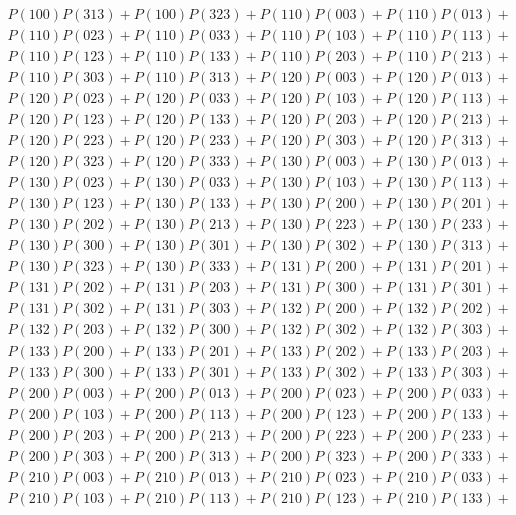 \documentclass{article}
\begin{document}
\begin{gather*}
        P(100)P(313) + P(100)P(323) + P(110)P(003) + P(110)P(013) + \\
        P(110)P(023) + P(110)P(033) + P(110)P(103) + P(110)P(113) + \\
        P(110)P(123) + P(110)P(133) + P(110)P(203) + P(110)P(213) + \\
        P(110)P(303) + P(110)P(313) + P(120)P(003) + P(120)P(013) + \\
        P(120)P(023) + P(120)P(033) + P(120)P(103) + P(120)P(113) + \\
        P(120)P(123) + P(120)P(133) + P(120)P(203) + P(120)P(213) + \\
        P(120)P(223) + P(120)P(233) + P(120)P(303) + P(120)P(313) + \\
        P(120)P(323) + P(120)P(333) + P(130)P(003) + P(130)P(013) + \\
        P(130)P(023) + P(130)P(033) + P(130)P(103) + P(130)P(113) + \\
        P(130)P(123) + P(130)P(133) + P(130)P(200) + P(130)P(201) + \\
        P(130)P(202) + P(130)P(213) + P(130)P(223) + P(130)P(233) + \\
        P(130)P(300) + P(130)P(301) + P(130)P(302) + P(130)P(313) + \\
        P(130)P(323) + P(130)P(333) + P(131)P(200) + P(131)P(201) + \\
        P(131)P(202) + P(131)P(203) + P(131)P(300) + P(131)P(301) + \\
        P(131)P(302) + P(131)P(303) + P(132)P(200) + P(132)P(202) + \\
        P(132)P(203) + P(132)P(300) + P(132)P(302) + P(132)P(303) + \\
        P(133)P(200) + P(133)P(201) + P(133)P(202) + P(133)P(203) + \\
        P(133)P(300) + P(133)P(301) + P(133)P(302) + P(133)P(303) + \\
        P(200)P(003) + P(200)P(013) + P(200)P(023) + P(200)P(033) + \\
        P(200)P(103) + P(200)P(113) + P(200)P(123) + P(200)P(133) + \\
        P(200)P(203) + P(200)P(213) + P(200)P(223) + P(200)P(233) + \\
        P(200)P(303) + P(200)P(313) + P(200)P(323) + P(200)P(333) + \\
        P(210)P(003) + P(210)P(013) + P(210)P(023) + P(210)P(033) + \\
        P(210)P(103) + P(210)P(113) + P(210)P(123) + P(210)P(133) + \\

\end{gather*}
\end{document}
